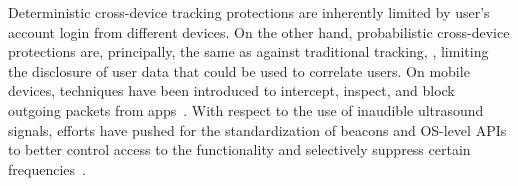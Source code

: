  Deterministic cross-device tracking protections are inherently limited by user's account login from different devices. On the other hand, probabilistic cross-device protections are, principally, the same as against traditional tracking, \eg{}, limiting the disclosure of user data that could be used to correlate users. 
On mobile devices, techniques have been introduced to intercept, inspect, and block outgoing packets from apps~\cite{shubaNoMoAdsEffectiveEfficient2018}. With respect to the use of inaudible ultrasound signals, efforts have pushed for the standardization of beacons and OS-level APIs to better control access to the functionality and selectively suppress certain frequencies~\cite{mavroudisPrivacySecurityUltrasound2017}.

